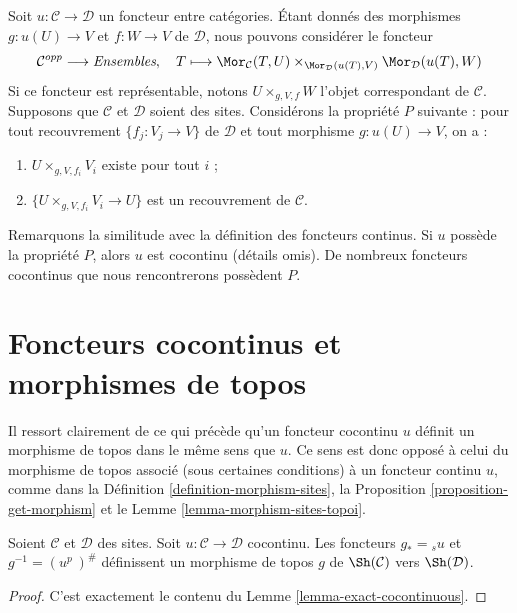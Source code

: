 \begin{remark}
\label{remark-cartesian-cocontinuous}
Soit $u : \mathcal{C} \to \mathcal{D}$ un foncteur entre catégories.
Étant donnés des morphismes $g : u(U) \to V$ et $f : W \to V$
de $\mathcal{D}$, nous pouvons considérer le foncteur
$$
\mathcal{C}^{opp} \longrightarrow \textit{Ensembles},\quad
T \longmapsto
\Mor_\mathcal{C}(T, U)
\times_{\Mor_\mathcal{D}(u(T), V)}
\Mor_\mathcal{D}(u(T), W)
$$
Si ce foncteur est représentable, notons
$U \times_{g, V, f} W$ l’objet correspondant de $\mathcal{C}$.
Supposons que $\mathcal{C}$ et $\mathcal{D}$ soient des sites.
Considérons la propriété $P$ suivante : pour tout recouvrement
$\{f_j : V_j \to V\}$ de $\mathcal{D}$ et tout morphisme
$g : u(U) \to V$, on a :
\begin{enumerate}
\item $U \times_{g, V, f_i} V_i$ existe pour tout $i$ ;
\item $\{U \times_{g, V, f_i} V_i \to U\}$ est un recouvrement de $\mathcal{C}$.
\end{enumerate}
Remarquons la similitude avec la définition des foncteurs continus.
Si $u$ possède la propriété $P$, alors $u$ est cocontinu (détails omis).
De nombreux foncteurs cocontinus que nous rencontrerons possèdent $P$.
\end{remark}

\section{Foncteurs cocontinus et morphismes de topos}
\label{section-cocontinuous-morphism-topoi}

\noindent
Il ressort clairement de ce qui précède qu’un foncteur cocontinu $u$
définit un morphisme de topos dans le même sens que $u$.
Ce sens est donc opposé à celui du morphisme de topos associé
(sous certaines conditions) à un foncteur continu $u$, comme dans la
Définition \ref{definition-morphism-sites}, la
Proposition \ref{proposition-get-morphism} et le
Lemme \ref{lemma-morphism-sites-topoi}.

\begin{lemma}
\label{lemma-cocontinuous-morphism-topoi}
Soient $\mathcal{C}$ et $\mathcal{D}$ des sites.
Soit $u : \mathcal{C} \to \mathcal{D}$ cocontinu.
Les foncteurs $g_* = {}_su$ et $g^{-1} = (u^p\ )^\#$
définissent un morphisme de topos $g$ de $\Sh(\mathcal{C})$ vers
$\Sh(\mathcal{D})$.
\end{lemma}

\begin{proof}
C’est exactement le contenu du Lemme \ref{lemma-exact-cocontinuous}.
\end{proof}

